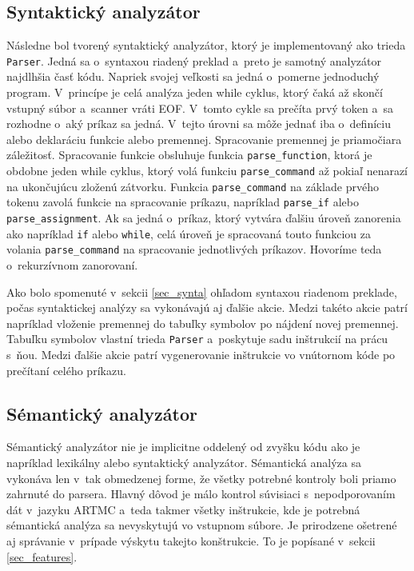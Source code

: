\subsection{Syntaktický analyzátor}
Následne bol tvorený syntaktický analyzátor, ktorý je implementovaný ako trieda \texttt{Parser}. Jedná sa o~syntaxou riadený preklad a~preto je samotný analyzátor najdlhšia časť kódu. Napriek svojej veľkosti sa jedná o~pomerne jednoduchý program. V~princípe je celá analýza jeden while cyklus, ktorý čaká až skončí vstupný súbor a~scanner vráti EOF. V~tomto cykle sa prečíta prvý token a~sa rozhodne o~aký príkaz sa jedná. V~tejto úrovni sa môže jednať iba o~definíciu alebo deklaráciu funkcie alebo premennej. Spracovanie premennej je priamočiara záležitosť. Spracovanie funkcie obsluhuje funkcia \texttt{parse\_function}, ktorá je obdobne jeden while cyklus, ktorý volá funkciu \texttt{parse\_command} až pokiaľ nenarazí na ukončujúcu zloženú zátvorku. Funkcia \texttt{parse\_command}
na základe prvého tokenu zavolá funkcie na spracovanie príkazu, napríklad \texttt{parse\_if} alebo \texttt{parse\_assignment}. Ak sa jedná o~príkaz, ktorý vytvára ďalšiu úroveň zanorenia ako napríklad \texttt{if} alebo \texttt{while}, celá úroveň je spracovaná touto funkciou za volania  \texttt{parse\_command} na spracovanie jednotlivých príkazov. Hovoríme teda o~rekurzívnom zanorovaní.

Ako bolo spomenuté v~sekcii \ref{sec_synta} ohľadom syntaxou riadenom preklade, počas syntaktickej analýzy sa vykonávajú aj ďalšie akcie. Medzi takéto akcie patrí napríklad vloženie premennej do tabuľky symbolov po nájdení novej premennej. Tabuľku symbolov vlastní trieda \texttt{Parser} a~poskytuje sadu inštrukcií na prácu s~ňou. Medzi ďalšie akcie patrí vygenerovanie inštrukcie vo vnútornom kóde po prečítaní celého príkazu. 

\subsection{Sémantický analyzátor}
Sémantický analyzátor nie je implicitne oddelený od zvyšku kódu ako je napríklad lexikálny alebo syntaktický analyzátor. Sémantická analýza sa vykonáva len v~tak obmedzenej forme, že všetky potrebné kontroly boli priamo zahrnuté do parsera. Hlavný dôvod je málo kontrol súvisiaci s~nepodporovaním dát v~jazyku ARTMC a~teda takmer všetky inštrukcie, kde je potrebná sémantická analýza sa nevyskytujú vo vstupnom súbore. Je prirodzene ošetrené aj správanie v~prípade výskytu takejto konštrukcie. To je popísané v~sekcii \ref{sec_features}.

